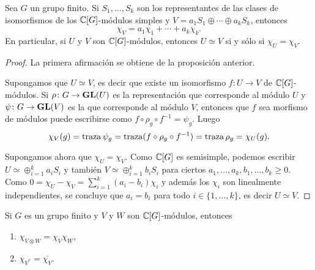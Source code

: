 \begin{theorem}
  Sea $G$ un grupo finito. Si $S_1,\dots,S_k$ son los representantes 
  de las clases de isomorfismos de los $\mathbb{C}[G]$-módulos simples y 
  $V=a_1S_1\oplus\cdots\oplus a_kS_k$, entonces
  \[
  \chi_V=a_1\chi_1+\cdots+a_k\chi_k.
  \]
  En particular, si $U$ y $V$ son $\mathbb{C}[G]$-módulos, 
  entonces $U\simeq V$ si y sólo si $\chi_U=\chi_V$.
\end{theorem}

\begin{proof}
    La primera afirmación se obtiene de la proposición anterior. 
    
    Supongamos que $U\simeq V$, es decir que existe un isomorfismo $f\colon U\to V$ de $\mathbb{C}[G]$-módulos. Si $\rho\colon G\to\mathbf{GL}(U)$ 
    es la representación que corresponde al módulo $U$ y $\psi\colon G\to\mathbf{GL}(V)$ es la que corresponde al módulo $V$, entonces
    que $f$ sea morfismo de módulos puede escribirse como 
    $f\circ\rho_g\circ f^{-1}=\psi_g$. Luego
    \[
    \chi_V(g)=\operatorname{traza}\psi_g=\operatorname{traza}(f\circ\rho_g\circ f^{-1})=\operatorname{traza}\rho_g=\chi_U(g).
    \]
    
    Supongamos ahora que $\chi_U=\chi_V$. Como $\mathbb{C}[G]$ es semisimple, podemos
    escribir $U\simeq \oplus_{i=1}^k a_iS_i$ y 
    también $V\simeq\oplus_{i=1}^k b_iS_i$ para ciertos $a_1,\dots,a_k,b_1,\dots,b_k\geq0$. 
    Como $0=\chi_U-\chi_V=\sum_{i=1}^k(a_i-b_i)\chi_i$ y además los $\chi_i$ son linealmente independientes, 
    se concluye que $a_i=b_i$ para todo $i\in\{1,\dots,k\}$, es decir $U\simeq V$.
\end{proof}

\begin{proposition}
	Si $G$ es un grupo finito y $V$ y $W$ son $\mathbb{C}[G]$-módulos, entonces 
	\begin{enumerate}
		\item $\chi_{V\otimes W}=\chi_V\chi_W$,
		\item $\chi_{V^*}=\overline{\chi_V}$.
	\end{enumerate}
\end{proposition}

